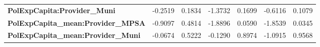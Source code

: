 \begin{center}
\begin{tabular}{lcccccc}
\textbf{PolExpCapita:Provider\_Muni}       &      -0.2519       &       0.1834       &     -1.3732     &      0.1699      &      -0.6116      &       0.1079       \\
\textbf{PolExpCapita\_mean:Provider\_MPSA} &      -0.9097       &       0.4814       &     -1.8896     &      0.0590      &      -1.8539      &       0.0345       \\
\textbf{PolExpCapita\_mean:Provider\_Muni} &      -0.0674       &       0.5222       &     -0.1290     &      0.8974      &      -1.0915      &       0.9568       \\
\bottomrule
\end{tabular}
\end{center}

